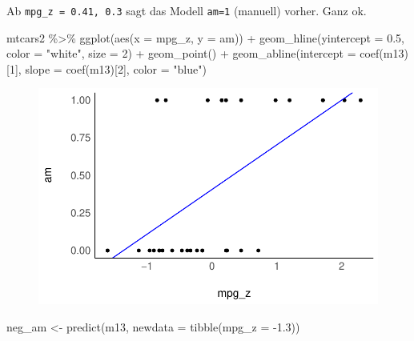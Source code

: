 \documentclass[
  a4paper,
  DIV=11]{scrreprt}
\newenvironment{Shaded}{\begin{snugshade}}{\end{snugshade}}
\newcommand{\AttributeTok}[1]{\textcolor[rgb]{0.40,0.45,0.13}{#1}}
\newcommand{\DecValTok}[1]{\textcolor[rgb]{0.68,0.00,0.00}{#1}}
\newcommand{\FloatTok}[1]{\textcolor[rgb]{0.68,0.00,0.00}{#1}}
\newcommand{\FunctionTok}[1]{\textcolor[rgb]{0.28,0.35,0.67}{#1}}
\newcommand{\NormalTok}[1]{\textcolor[rgb]{0.00,0.23,0.31}{#1}}
\newcommand{\OtherTok}[1]{\textcolor[rgb]{0.00,0.23,0.31}{#1}}
\newcommand{\SpecialCharTok}[1]{\textcolor[rgb]{0.37,0.37,0.37}{#1}}
\newcommand{\StringTok}[1]{\textcolor[rgb]{0.13,0.47,0.30}{#1}}
\theoremstyle{definition}
\theoremstyle{remark}
\begin{document}
Ab \texttt{mpg\_z\ =\ 0.41,\ 0.3} sagt das Modell \texttt{am=1}
(manuell) vorher. Ganz ok.

\begin{Shaded}
\begin{Highlighting}[]
\NormalTok{mtcars2 }\SpecialCharTok{\%\textgreater{}\%} 
  \FunctionTok{ggplot}\NormalTok{(}\FunctionTok{aes}\NormalTok{(}\AttributeTok{x =}\NormalTok{ mpg\_z, }\AttributeTok{y =}\NormalTok{ am)) }\SpecialCharTok{+}
  \FunctionTok{geom\_hline}\NormalTok{(}\AttributeTok{yintercept =} \FloatTok{0.5}\NormalTok{, }\AttributeTok{color =} \StringTok{"white"}\NormalTok{, }\AttributeTok{size =} \DecValTok{2}\NormalTok{) }\SpecialCharTok{+}
  \FunctionTok{geom\_point}\NormalTok{() }\SpecialCharTok{+}
  \FunctionTok{geom\_abline}\NormalTok{(}\AttributeTok{intercept =} \FunctionTok{coef}\NormalTok{(m13)[}\DecValTok{1}\NormalTok{],}
              \AttributeTok{slope =} \FunctionTok{coef}\NormalTok{(m13)[}\DecValTok{2}\NormalTok{],}
              \AttributeTok{color =} \StringTok{"blue"}\NormalTok{) }
\end{Highlighting}
\end{Shaded}

\begin{figure}[H]

{\centering \includegraphics{./metrische-AV_files/figure-pdf/unnamed-chunk-57-1.pdf}

}

\end{figure}

\begin{Shaded}
\begin{Highlighting}[]
\NormalTok{neg\_am }\OtherTok{\textless{}{-}} \FunctionTok{predict}\NormalTok{(m13, }\AttributeTok{newdata =} \FunctionTok{tibble}\NormalTok{(}\AttributeTok{mpg\_z =} \SpecialCharTok{{-}}\FloatTok{1.3}\NormalTok{))}
\end{Highlighting}
\end{Shaded}
\end{document}
